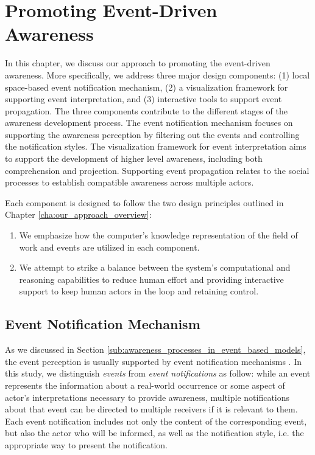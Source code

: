 \graphicspath{{Figures/}}

\chapter{Promoting Event-Driven Awareness} %
\label{cha:promoting_event_driven_awareness}
In this chapter, we discuss our approach to promoting the event-driven awareness. More specifically, we address three major design components: (1) local space-based event notification mechanism, (2) a visualization framework for supporting event interpretation, and (3) interactive tools to support event propagation. The three components contribute to the different stages of the awareness development process. The event notification mechanism focuses on supporting the awareness perception by filtering out the events and controlling the notification styles. The visualization framework for event interpretation aims to support the development of higher level awareness, including both comprehension and projection. Supporting event propagation relates to the social processes to establish compatible awareness across multiple actors.

Each component is designed to follow the two design principles outlined in Chapter \ref{cha:our_approach_overview}:
\begin{enumerate}
	\item We emphasize how the computer's knowledge representation of the field of work and events are utilized in each component.
	\item We attempt to strike a balance between the system's computational and reasoning capabilities to reduce human effort and providing interactive support to keep human actors in the loop and retaining control.
\end{enumerate}

\section{Event Notification Mechanism} %
\label{sec:event_notification_mechanism}
As we discussed in Section \ref{sub:awareness_processes_in_event_based_models}, the event perception is usually supported by event notification mechanisms \cite{McCrickard2003}. In this study, we distinguish \emph{events} from \emph{event notifications} as follow: while an event represents the information about a real-world occurrence or some aspect of actor's interpretations necessary to provide awareness, multiple notifications about that event can be directed to multiple receivers if it is relevant to them. Each event notification includes not only the content of the corresponding event, but also the actor who will be informed, as well as the notification style, i.e. the appropriate way to present the notification.

